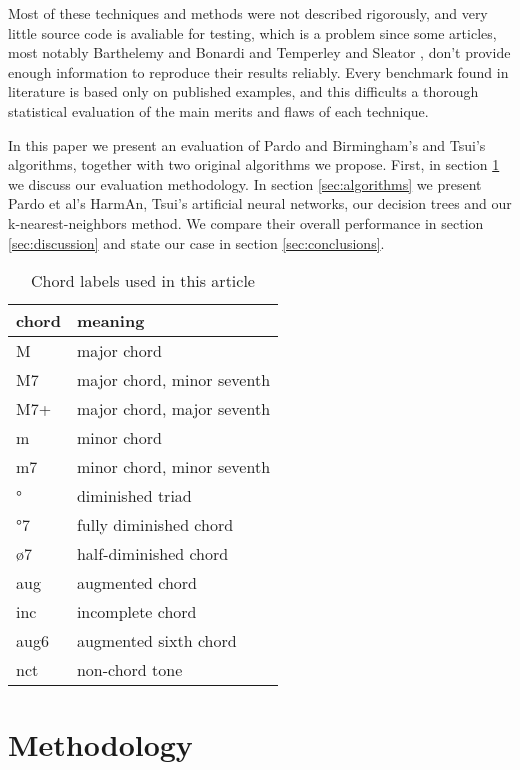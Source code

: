 \documentclass{article}
\begin{document}
Most of these techniques and methods were not described rigorously,
and very little source code is avaliable for testing, which is a
problem since some articles, most notably Barthelemy and Bonardi
\cite{pardo.ea02:algorithms} and Temperley and Sleator
\cite{temperley.ea99:modeling}, don't provide enough information to
reproduce their results reliably. Every benchmark found in literature
\cite{pardo.ea00:automated, pardo.ea02:algorithms, tsui02:harmonic,
  taube99:automatic, illescas.ea07:harmonic} is based only on published
examples, and this difficults a thorough statistical evaluation of the
main merits and flaws of each technique.

In this paper we present an evaluation of Pardo and Birmingham's and
Tsui's algorithms, together with two original algorithms we propose.
First, in section \ref{sec:methodology} we discuss our evaluation
methodology. In section \ref{sec:algorithms} we present Pardo et al's
HarmAn, Tsui's artificial neural networks, our decision trees and our
k-nearest-neighbors method. We compare their overall performance in
section \ref{sec:discussion} and state our case in section
\ref{sec:conclusions}.

\begin{table}
\centering
\begin{tabular}{l|l}
chord & meaning \\ \hline
    M & major chord \\
   M7 & major chord, minor seventh \\
  M7+ & major chord, major seventh \\
    m & minor chord \\
   m7 & minor chord, minor seventh \\
    ° & diminished triad \\
   °7 & fully diminished chord \\
   ø7 & half-diminished chord \\
  aug & augmented chord \\
  inc & incomplete chord \\
 aug6 & augmented sixth chord \\
  nct & non-chord tone \\
\end{tabular}
\caption{Chord labels used in this article}
\label{tab:legenda}
\end{table}

\section{Methodology}
\label{sec:methodology}
\end{document}
